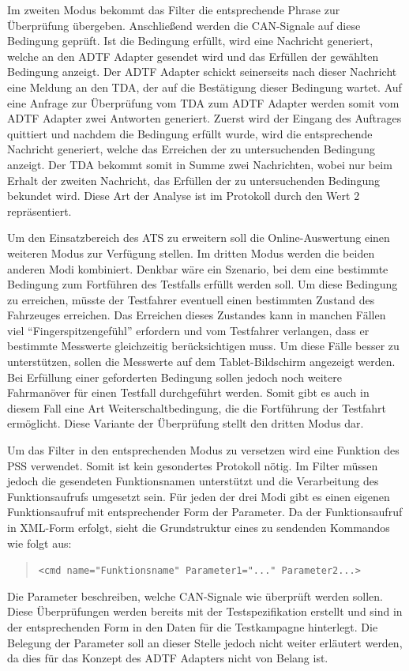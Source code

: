 \documentclass[12pt,a4paper]{report}
\begin{document}
Im zweiten Modus bekommt das Filter die entsprechende Phrase zur Überprüfung übergeben. Anschließend werden die CAN-Signale auf diese Bedingung geprüft. Ist die Bedingung erfüllt, wird eine Nachricht generiert, welche an den ADTF Adapter gesendet wird und das Erfüllen der gewählten Bedingung anzeigt. Der ADTF Adapter schickt seinerseits nach dieser Nachricht eine Meldung an den TDA, der auf die Bestätigung dieser Bedingung wartet. Auf eine Anfrage zur Überprüfung vom TDA zum ADTF Adapter werden somit vom ADTF Adapter zwei Antworten generiert. Zuerst wird der Eingang des Auftrages quittiert und nachdem die Bedingung erfüllt wurde, wird die entsprechende Nachricht generiert, welche das Erreichen der zu untersuchenden Bedingung anzeigt. Der TDA bekommt somit in Summe zwei Nachrichten, wobei nur beim Erhalt der zweiten Nachricht, das Erfüllen der zu untersuchenden Bedingung bekundet wird. Diese Art der Analyse ist im Protokoll durch den Wert 2 repräsentiert.

Um den Einsatzbereich des ATS zu erweitern soll die Online-Auswertung einen weiteren Modus zur Verfügung stellen. Im dritten Modus werden die beiden anderen Modi kombiniert. Denkbar wäre ein Szenario, bei dem eine bestimmte Bedingung zum Fortführen des Testfalls erfüllt werden soll. Um diese Bedingung zu erreichen, müsste der Testfahrer eventuell einen bestimmten Zustand des Fahrzeuges erreichen. Das Erreichen dieses Zustandes kann in manchen Fällen viel "`Fingerspitzengefühl"' erfordern und vom Testfahrer verlangen, dass er bestimmte Messwerte gleichzeitig berücksichtigen muss. Um diese Fälle besser zu unterstützen, sollen die Messwerte auf dem Tablet-Bildschirm angezeigt werden. Bei Erfüllung einer geforderten Bedingung sollen jedoch noch weitere Fahrmanöver für einen Testfall durchgeführt werden. Somit gibt es auch in diesem Fall eine Art Weiterschaltbedingung, die die Fortführung der Testfahrt ermöglicht. Diese Variante der Überprüfung stellt den dritten Modus dar.

Um das Filter in den entsprechenden Modus zu versetzen wird eine Funktion des PSS verwendet. Somit ist kein gesondertes Protokoll nötig. Im Filter müssen jedoch die gesendeten Funktionsnamen unterstützt und die Verarbeitung des Funktionsaufrufs umgesetzt sein.
Für jeden der drei Modi gibt es einen eigenen Funktionsaufruf mit entsprechender Form der Parameter. Da der Funktionsaufruf in XML-Form erfolgt, sieht die Grundstruktur eines zu sendenden Kommandos wie folgt aus:
\begin{quote}
\verb|<cmd name="Funktionsname" Parameter1="..." Parameter2...>|
\end{quote}
Die Parameter beschreiben, welche CAN-Signale wie überprüft werden sollen. Diese Über\-prüfungen werden bereits mit der Testspezifikation erstellt und sind in der entsprechenden Form in den Daten für die Testkampagne hinterlegt. Die Belegung der Parameter soll an dieser Stelle jedoch nicht weiter erläutert werden, da dies für das Konzept des ADTF Adapters nicht von Belang ist. 
\end{document}
